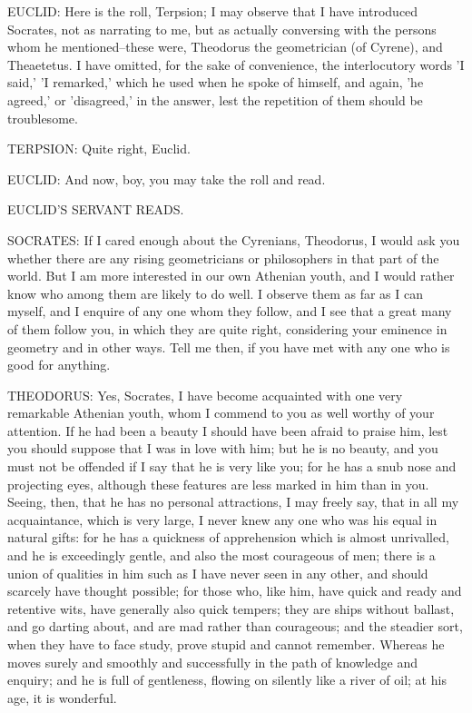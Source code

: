 EUCLID: Here is the roll, Terpsion; I may observe that I have introduced
Socrates, not as narrating to me, but as actually conversing with the
persons whom he mentioned--these were, Theodorus the geometrician (of
Cyrene), and Theaetetus. I have omitted, for the sake of convenience,
the interlocutory words 'I said,' 'I remarked,' which he used when he
spoke of himself, and again, 'he agreed,' or 'disagreed,' in the answer,
lest the repetition of them should be troublesome.

TERPSION: Quite right, Euclid.

EUCLID: And now, boy, you may take the roll and read.

EUCLID'S SERVANT READS.

SOCRATES: If I cared enough about the Cyrenians, Theodorus, I would ask
you whether there are any rising geometricians or philosophers in that
part of the world. But I am more interested in our own Athenian youth,
and I would rather know who among them are likely to do well. I observe
them as far as I can myself, and I enquire of any one whom they follow,
and I see that a great many of them follow you, in which they are quite
right, considering your eminence in geometry and in other ways. Tell me
then, if you have met with any one who is good for anything.

THEODORUS: Yes, Socrates, I have become acquainted with one very
remarkable Athenian youth, whom I commend to you as well worthy of your
attention. If he had been a beauty I should have been afraid to praise
him, lest you should suppose that I was in love with him; but he is no
beauty, and you must not be offended if I say that he is very like you;
for he has a snub nose and projecting eyes, although these features are
less marked in him than in you. Seeing, then, that he has no personal
attractions, I may freely say, that in all my acquaintance, which is
very large, I never knew any one who was his equal in natural gifts: for
he has a quickness of apprehension which is almost unrivalled, and he
is exceedingly gentle, and also the most courageous of men; there is a
union of qualities in him such as I have never seen in any other, and
should scarcely have thought possible; for those who, like him, have
quick and ready and retentive wits, have generally also quick tempers;
they are ships without ballast, and go darting about, and are mad rather
than courageous; and the steadier sort, when they have to face study,
prove stupid and cannot remember. Whereas he moves surely and smoothly
and successfully in the path of knowledge and enquiry; and he is full of
gentleness, flowing on silently like a river of oil; at his age, it is
wonderful.


